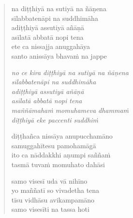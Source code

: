 \clearpage
\begin{verse}

na diṭṭhiyā na sutiyā na ñāṇena\\
sīlabbatenāpi na suddhimāha\\
adiṭṭhiyā assutiyā añāṇā\\
asīlatā abbatā nopi tena\\
ete ca nissajja anuggahāya\\
santo anissāya bhavaṁ na jappe

\emph{no ce kira diṭṭhiyā na sutiyā na ñāṇena}\\
\emph{sīlabbatenāpi na suddhimāha}\\
\emph{adiṭṭhiyā assutiyā añāṇā}\\
\emph{asīlatā abbatā nopi tena}\\
\emph{maññāmahaṁ momuhameva dhammaṁ}\\
\emph{diṭṭhiyā eke paccenti suddhiṁ}

diṭṭhañca nissāya anupucchamāno\\
samuggahītesu pamohamāgā\\
ito ca nāddakkhi aṇumpi saññaṁ\\
tasmā tuvaṁ momuhato dahāsi

samo visesī uda vā nihīno\\
yo maññatī so vivadetha tena\\
tīsu vidhāsu avikampamāno\\
samo visesīti na tassa hoti

\end{verse}


